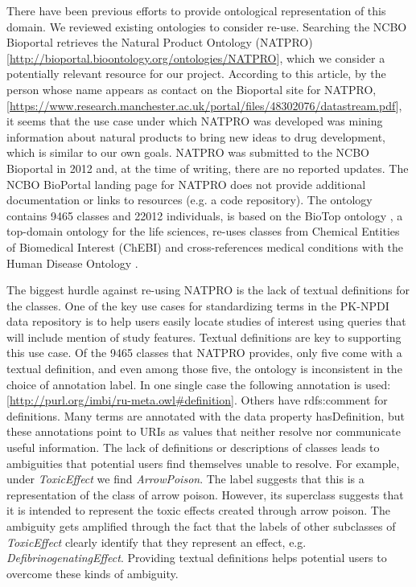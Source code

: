 \documentclass{bmcart}
\begin{document}
There have been previous efforts to provide ontological representation of this domain.
We reviewed  existing  ontologies to consider re-use.
Searching the NCBO Bioportal \cite{pmid21672956} retrieves the  Natural Product Ontology (NATPRO) [\url{http://bioportal.bioontology.org/ontologies/NATPRO}], which we consider a potentially relevant resource for our project.
According to this article, by the person whose name appears as contact on the Bioportal site for NATPRO, [\url{https://www.research.manchester.ac.uk/portal/files/48302076/datastream.pdf}], it seems that the use case under which NATPRO was developed was mining information about natural products to bring new ideas to drug development, which is similar to our own goals.
NATPRO was submitted to the NCBO Bioportal in 2012 and, at the time of writing, there are no reported updates.
The NCBO BioPortal  landing page  for NATPRO does not provide additional documentation or links to resources (e.g. a code repository).
The ontology contains 9465 classes and 22012 individuals, is based on the BioTop  ontology \cite{DBLP:journals/ao/BeisswangerSSH08}, a top-domain ontology for the life sciences, re-uses classes from Chemical Entities of Biomedical Interest (ChEBI) \cite{Degtyarenko} and cross-references medical conditions with the Human Disease Ontology \cite{pmid22080554}.

The biggest hurdle against re-using NATPRO is the lack of textual definitions for the classes.
One of the key use cases for standardizing terms in the PK-NPDI data repository is to help users easily locate studies of interest using queries that will include mention of study features.
Textual definitions are key to supporting this use case.
Of the 9465 classes that NATPRO provides, only five come with a textual definition, and even among those five, the ontology is inconsistent in the choice of annotation label. %
In one single case the following annotation is used: [\url{http://purl.org/imbi/ru-meta.owl#definition}].
Others have rdfs:comment for definitions.
Many terms are annotated with the data property hasDefinition, but these annotations point to URIs as values that neither resolve nor communicate useful information.
The lack of definitions or descriptions of classes leads to ambiguities that potential users find themselves unable to resolve.
For example, under \textit{ToxicEffect} we find \textit{ArrowPoison}. The label suggests that this is a representation of the class of arrow poison.
However, its superclass suggests that it is intended to represent the toxic effects created through arrow poison.
The ambiguity gets amplified through the fact that the labels of other subclasses of \textit{ToxicEffect} clearly identify that they represent an effect, e.g. \textit{DefibrinogenatingEffect}.
Providing  textual definitions helps potential users to overcome these kinds of ambiguity.
\end{document}
